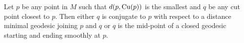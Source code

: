 \vspace{0.3cm}
\begin{thm}\cite[Theorem 4.5]{Kob67}\label{thm:ExistenseOfClosedGeodesic-2}
    Let $p$ be any point in $M$ such that $d(p,\cutn[p])$ is the smallest and $q$ be any cut point closest to $p$. Then either $q$ is conjugate to $p$  with respect to a distance minimal geodesic joining $p$ and $q$ or $q$ is the mid-point of a closed geodesic starting and ending smoothly at $p$.
\end{thm}
